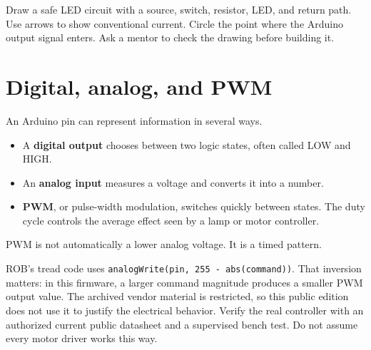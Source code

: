 \documentclass[11pt,openany]{book}
\begin{document}
\begin{buildbox}[title={DRAW BEFORE YOU WIRE}]
Draw a safe LED circuit with a source, switch, resistor, LED, and return path. Use arrows to show conventional current. Circle the point where the Arduino output signal enters. Ask a mentor to check the drawing before building it.
\end{buildbox}



\chapter{Digital, analog, and PWM}

An Arduino pin can represent information in several ways.

\begin{itemize}
  \item A \textbf{digital output} chooses between two logic states, often called LOW and HIGH.
  \item An \textbf{analog input} measures a voltage and converts it into a number.
  \item \textbf{PWM}, or pulse-width modulation, switches quickly between states. The duty cycle controls the average effect seen by a lamp or motor controller.
\end{itemize}

PWM is not automatically a lower analog voltage. It is a timed pattern.

\begin{center}
\end{center}

ROB's tread code uses \texttt{analogWrite(pin, 255 - abs(command))}. That inversion matters: in this firmware, a larger command magnitude produces a smaller PWM output value. The archived vendor material is restricted, so this public edition does not use it to justify the electrical behavior. Verify the real controller with an authorized current public datasheet and a supervised bench test. Do not assume every motor driver works this way.
\end{document}
